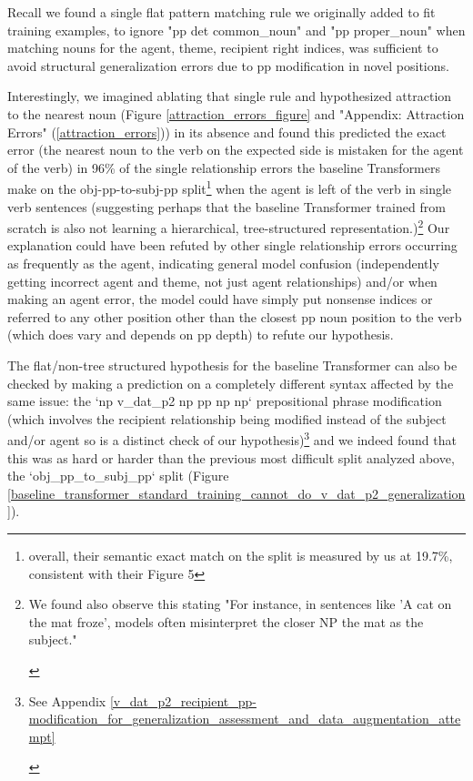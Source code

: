 \documentclass[11pt]{article}
\begin{document}
Recall we found a single flat pattern matching rule we originally added to fit training examples, to ignore "pp det common\_noun" and "pp proper\_noun" when matching nouns for the agent, theme, recipient right indices, was sufficient to avoid structural generalization errors due to pp modification in novel positions. 

Interestingly, we imagined ablating that single rule and hypothesized attraction to the nearest noun (Figure \ref{attraction_errors_figure} and "Appendix: Attraction Errors" (\ref{attraction_errors})) in its absence and found this predicted the exact error (the nearest noun to the verb on the expected side is mistaken for the agent of the verb)
in 96\% of the single relationship errors the \citep{Wu2023} baseline Transformers make on the obj-pp-to-subj-pp split\footnote{overall, their semantic exact match on the split is measured by us at 19.7\%, consistent with their Figure 5} when the agent is left of the verb in single verb sentences
(suggesting perhaps that the baseline \citep{Wu2023} Transformer trained from scratch is also not learning a hierarchical, tree-structured representation.)\footnote{\begin{footnotesize}We found \citep{li2023slogstructuralgeneralizationbenchmark} also observe this stating "For instance, in sentences like 'A cat on the mat froze', models often misinterpret the closer NP the mat as the subject."\end{footnotesize}}
Our explanation could have been refuted by other single relationship errors occurring as frequently as the agent, indicating general model confusion (independently getting incorrect agent and theme, not just agent relationships) and/or when making an agent error, the model could have simply put nonsense indices or referred to any other position other than the closest pp noun position to the verb (which does vary and depends on pp depth) to refute our hypothesis.

The flat/non-tree structured hypothesis for the baseline Transformer can also be checked by making a prediction on a completely different syntax affected by the same issue: the `np v\_dat\_p2 np pp np np` prepositional phrase modification (which involves the recipient relationship being modified instead of the subject and/or agent so is a distinct check of our hypothesis)\footnote{\begin{footnotesize}See Appendix \ref{v_dat_p2_recipient_pp-modification_for_generalization_assessment_and_data_augmentation_attempt}\end{footnotesize}} and we indeed found that this was as hard or harder than the previous most difficult split analyzed above, the `obj\_pp\_to\_subj\_pp` split (Figure \ref{baseline_transformer_standard_training_cannot_do_v_dat_p2_generalization}).
\end{document}
